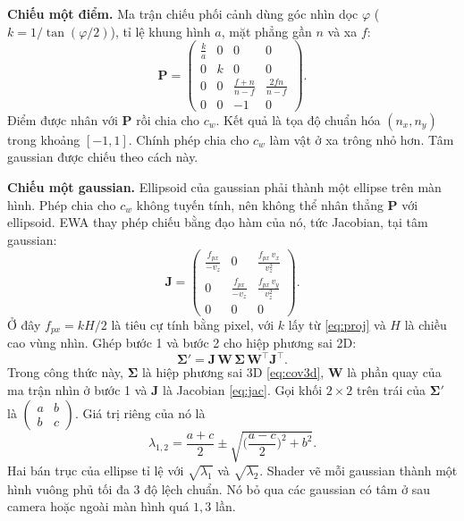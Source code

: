\documentclass[9pt,twocolumn,a4paper]{extarticle}
\newcommand{\Sig}{\symbf{\Sigma}}
\begin{document}
\textbf{Chiếu một điểm.} Ma trận chiếu phối cảnh dùng góc nhìn dọc $\varphi$ ($k=1/\tan(\varphi/2)$), tỉ lệ khung hình $a$, mặt phẳng gần $n$ và xa $f$:
\begin{equation}
\mathbf{P}=\begin{pmatrix}
\frac{k}{a}&0&0&0\\0&k&0&0\\
0&0&\frac{f+n}{n-f}&\frac{2fn}{n-f}\\0&0&-1&0\end{pmatrix}.
\label{eq:proj}
\end{equation}
Điểm được nhân với $\mathbf{P}$ rồi chia cho $c_w$. Kết quả là tọa độ chuẩn hóa $(n_x,n_y)$ trong khoảng $[-1,1]$. Chính phép chia cho $c_w$ làm vật ở xa trông nhỏ hơn. Tâm gaussian được chiếu theo cách này.

\par\noindent{}\par\vspace{3pt}

\textbf{Chiếu một gaussian.} Ellipsoid của gaussian phải thành một ellipse trên màn hình. Phép chia cho $c_w$ không tuyến tính, nên không thể nhân thẳng $\mathbf{P}$ với ellipsoid. EWA thay phép chiếu bằng đạo hàm của nó, tức Jacobian, tại tâm gaussian:
\begin{equation}
\mathbf{J}=\begin{pmatrix}
\frac{f_{px}}{-v_z}&0&\frac{f_{px}\,v_x}{v_z^{2}}\\[1mm]
0&\frac{f_{px}}{-v_z}&\frac{f_{px}\,v_y}{v_z^{2}}\\[1mm]
0&0&0
\end{pmatrix}.
\label{eq:jac}
\end{equation}
Ở đây $f_{px}=kH/2$ là tiêu cự tính bằng pixel, với $k$ lấy từ \eqref{eq:proj} và $H$ là chiều cao vùng nhìn. Ghép bước 1 và bước 2 cho hiệp phương sai 2D:
\begin{equation}
\Sig'=\mathbf{J}\,\mathbf{W}\,\Sig\,\mathbf{W}^{\top}\mathbf{J}^{\top}.
\label{eq:ewa}
\end{equation}
Trong công thức này, $\Sig$ là hiệp phương sai 3D \eqref{eq:cov3d}, $\mathbf{W}$ là phần quay của ma trận nhìn ở bước 1 và $\mathbf{J}$ là Jacobian \eqref{eq:jac}. Gọi khối $2\times2$ trên trái của $\Sig'$ là $\begin{pmatrix}a&b\\b&c\end{pmatrix}$. Giá trị riêng của nó là
\begin{equation}
\lambda_{1,2}=\frac{a+c}{2}\pm\sqrt{\Big(\frac{a-c}{2}\Big)^{2}+b^{2}}.
\label{eq:eig}
\end{equation}
Hai bán trục của ellipse tỉ lệ với $\sqrt{\lambda_1}$ và $\sqrt{\lambda_2}$. Shader vẽ mỗi gaussian thành một hình vuông phủ tối đa 3 độ lệch chuẩn. Nó bỏ qua các gaussian có tâm ở sau camera hoặc ngoài màn hình quá $1{,}3$ lần.
\end{document}
